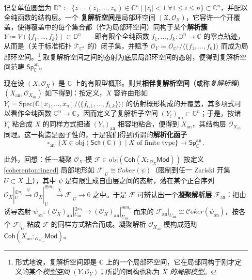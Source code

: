 \begin{Def}
	记复单位圆盘为 $\mathbb{D}^n\coloneqq\{z=(z_1,...,z_n)\in\mathbb{C}^n\mid |z_i|<1\;\forall 1\leq i\leq n\}\subset\mathbb{C}^n$，并配以全纯函数的结构层。一个 \textbf{复解析空间}是局部环空间 $(\mathfrak{X},\mathcal{O}_\mathfrak{X})$，它容许一个开覆盖，使得覆盖中的每个集合都（作为局部环空间）同构于某个\textbf{解析簇} $Y\coloneqq V(\{f_1,...,f_k\})\subset\mathbb{D}^n$——即有限个全纯函数 $f_1,...,f_k:\mathbb{D}^n\rightarrow\mathbb{C}$ 的零点轨迹，从而是（关于标准拓扑 $\mathcal{T}_{\mathbb{C}^n}$ 的）闭子集，并赋予 $\mathcal{O}_Y\coloneqq\mathcal{O}_{\mathbb{D}^n}/\langle\{f_1,...,f_k\}\rangle$ 而成为局部环空间。\footnote{形式地说，复解析空间即是 $\mathbb{C}$ 上的一个局部环空间，它在局部同构于刚才定义的某个\textit{模型空间} $(Y,\mathcal{O}_Y)$；所说的同构也称为 \textit{$X$ 的局部模型}。} 取复解析空间之间的态射为底层局部环空间的态射，便得到复解析空间范畴 $\mathsf{Sp}_\mathbb{C}^\text{an}$。

	现在设 $(X,\mathcal{O}_X)$ 是 $\mathbb{C}$ 上的有限型概形。则其\textbf{相伴复解析空间}（或称\textit{复解析簇}）$(X_\text{an},\mathcal{O}_{X_\text{an}})$ 如下得到：按定义，$X$ 容许由形如 $Y_i=\text{Spec}\big(\mathbb{C}[x_1,...,x_n]/\langle\{f_{i,1},...,f_{i,k}\}\rangle\big)$ 的仿射概形构成的开覆盖，其多项式可以看作全纯函数 $\mathbb{C}^n\rightarrow\mathbb{C}$，因而定义了复解析子空间 $(Y_i)_\text{an}\subset\mathbb{C}^n$；于是，按诸 $Y_i$ 粘合成 $X$ 的同样方式把诸 $(Y_i)_\text{an}$ 相容地粘合，便得到 $X_\text{an}$，其结构层 $\mathcal{O}_{X_\text{an}}$ 同理。这一构造是函子性的，于是我们得到所谓的\textbf{解析化函子}
	\[
	\square_\text{an}:\{X\in\text{obj}(\mathsf{Sch}(\mathbb{C}))\mid X\text{ of finite type}\}\rightarrow \mathsf{Sp}_\mathbb{C}^\text{an}\,.
	\]

	此外，回想：任一凝聚 $\mathcal{O}_X$-模 $\mathcal{F}\in\text{obj}(\mathsf{Coh}(X;{}_{\mathcal{O}_X}\!\mathsf{Mod}))$ 按定义 \ref{coherentonringed} 局部地形如 $\mathcal{F}|_U\cong\mathcal{C}oker(\psi)$（限制到任一 Zariski 开集 $U\subset X$ 上），其中 $\psi$ 是有限生成自由层之间的态射，落在某个正合序列 $\mathcal{O}_X|_U^{\oplus n_i}\xrightarrow{\psi}\mathcal{O}_X|_U^{\oplus m_i}\xrightarrow{\chi}\mathcal{F}|_U\rightarrow 0$ 之中。于是 $\mathcal{F}$ 可辨认出一个\textbf{凝聚解析层} $\mathcal{F}_\text{an}$：把由诱导态射 $\psi_\text{an}:(\mathcal{O}_X)_\text{an}|_{U_\text{an}}^{\oplus n_i}\rightarrow(\mathcal{O}_X)_\text{an}|_{U_\text{an}}^{\oplus m_i}$ 而来的 $\mathcal{F}_\text{an}|_{U_\text{an}}\cong\mathcal{C}oker(\psi_\text{an})$，按各个 $\mathcal{F}|_U$ 粘成 $\mathcal{F}$ 的同样方式粘合而成。凝聚解析 $\mathcal{O}_{X_\text{an}}$-模构成范畴 $\mathsf{Coh}(X_\text{an};{}_{\mathcal{O}_{X_\text{an}}}\!\!\!\mathsf{Mod})$。
\end{Def}

